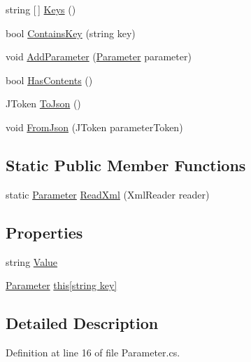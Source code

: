 \begin{DoxyCompactItemize}
\item 
string \mbox{[}$\,$\mbox{]} \hyperlink{class_parameter_a09ccb200567240478710aa444e7dd3ec}{Keys} ()
\item 
bool \hyperlink{class_parameter_a9bb3357bb1ea45d97294aaa081cfd999}{Contains\+Key} (string key)
\item 
void \hyperlink{class_parameter_a0aa6dd5ff84c7809a29c52f335af609f}{Add\+Parameter} (\hyperlink{class_parameter}{Parameter} parameter)
\item 
bool \hyperlink{class_parameter_aab7d76dd5beeccefe44936b6cf8b2598}{Has\+Contents} ()
\item 
J\+Token \hyperlink{class_parameter_ab1b13eeee0c6828f5b894ee44e9dad96}{To\+Json} ()
\item 
void \hyperlink{class_parameter_aa0690cb80138cbddf088b0001e99edb5}{From\+Json} (J\+Token parameter\+Token)
\end{DoxyCompactItemize}
\subsection*{Static Public Member Functions}
\begin{DoxyCompactItemize}
\item 
static \hyperlink{class_parameter}{Parameter} \hyperlink{class_parameter_ae81e5829c0eabcae1d59f3e3f9623ab6}{Read\+Xml} (Xml\+Reader reader)
\end{DoxyCompactItemize}
\subsection*{Properties}
\begin{DoxyCompactItemize}
\item 
string \hyperlink{class_parameter_a5acbdef0b462cc13649df132ad4bcd50}{Value}
\item 
\hyperlink{class_parameter}{Parameter} \hyperlink{class_parameter_a308d90e26d11d730580a60f69617e301}{this\mbox{[}string key\mbox{]}}
\end{DoxyCompactItemize}


\subsection{Detailed Description}


Definition at line 16 of file Parameter.\+cs.



